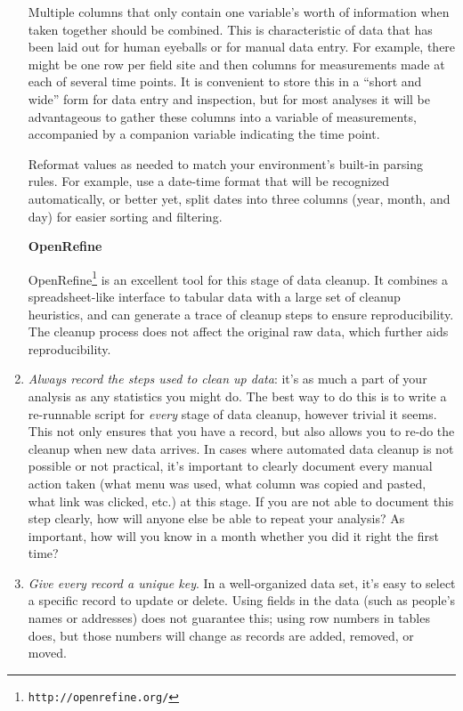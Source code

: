 \documentclass[10pt]{article}
\newcommand{\recommend}[1]{\textit{#1}}
\newcommand{\withurl}[2]{{#1}\footnote{\texttt{#2}}}
\begin{document}
\begin{enumerate}
  Multiple columns that only contain one variable's worth of information
  when taken together should be combined. This is characteristic of data
  that has been laid out for human eyeballs or for manual data entry.
  For example, there might be one row per field site and then columns
  for measurements made at each of several time points. It is convenient
  to store this in a ``short and wide'' form for data entry and
  inspection, but for most analyses it will be advantageous to gather
  these columns into a variable of measurements, accompanied by a
  companion variable indicating the time point.

  Reformat values as needed to match your environment's built-in
  parsing rules. For example, use a date-time format that will be
  recognized automatically, or better yet, split dates into three
  columns (year, month, and day) for easier sorting and filtering.

  \begin{framed}
    \noindent \textbf{OpenRefine}

    \withurl{OpenRefine}{http://openrefine.org/} is an excellent tool
    for this stage of data cleanup. It combines a spreadsheet-like
    interface to tabular data with a large set of cleanup heuristics,
    and can generate a trace of cleanup steps to ensure
    reproducibility.  The cleanup process does not affect the original
    raw data, which further aids reproducibility.
  \end{framed}

\item
  \recommend{Always record the steps used to clean up data}:
  it's as much a part of your analysis as any statistics you might do.
  The best way to do this is to write a re-runnable script for \emph{every}
  stage of data cleanup, however trivial it seems.
  This not only ensures that you have a record,
  but also allows you to re-do the cleanup when new data arrives.
  In cases where automated data cleanup is not possible or not practical,
  it's important to clearly document every manual action taken
  (what menu was used, what column was copied and pasted, 
  what link was clicked, etc.) at this stage.
  If you are not able to document this step clearly,
  how will anyone else be able to repeat your analysis?
  As important, how will you know in a month
  whether you did it right the first time?

\item
  \recommend{Give every record a unique key}.  In a
  well-organized data set, it's easy to select a specific record to
  update or delete.  Using fields in the data (such as people's names or
  addresses) does not guarantee this; using row numbers in tables does,
  but those numbers will change as records are added, removed, or moved.


\end{enumerate}
\end{document}
